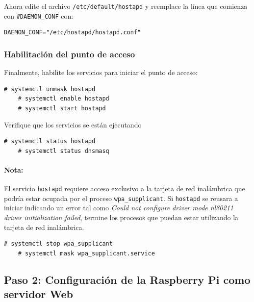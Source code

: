 \documentclass[letterpaper,10.5pt]{article}
\begin{document}
Ahora edite el archivo \texttt{/etc/default/hostapd} y reemplace la línea que comienza con \texttt{\#DAEMON\_CONF} con:

\begin{Verbatim}[gobble=1,commentchar=\%]
	DAEMON_CONF="/etc/hostapd/hostapd.conf"
\end{Verbatim}

\subsubsection{Habilitación del punto de acceso}%
\label{sec:ap-hotspot}

Finalmente, habilite los servicios para iniciar el punto de acceso:

\begin{Verbatim}[gobble=1,commentchar=\%]
	# systemctl unmask hostapd
	# systemctl enable hostapd
	# systemctl start hostapd
\end{Verbatim}

Verifique que los servicios se están ejecutando

\begin{Verbatim}[gobble=1,commentchar=\%]
	# systemctl status hostapd
	# systemctl status dnsmasq
\end{Verbatim}

\paragraph*{Nota:} El servicio \texttt{hostapd} requiere acceso exclusivo a la tarjeta de red inalámbrica que podría estar ocupada por el proceso \texttt{wpa\_supplicant}.
Si \texttt{hostapd} se reusara a iniciar indicando un error tal como \emph{Could not configure driver mode nl80211 driver initialization failed}, termine los procesos que puedan estar utilizando la tarjeta de red inalámbrica.

\begin{Verbatim}[gobble=1,commentchar=\%]
	# systemctl stop wpa_supplicant
	# systemctl mask wpa_supplicant.service
\end{Verbatim}

%
%
\subsection{Paso 2: Configuración de la Raspberry Pi como servidor Web}%
\label{sec:webserver}
\end{document}
